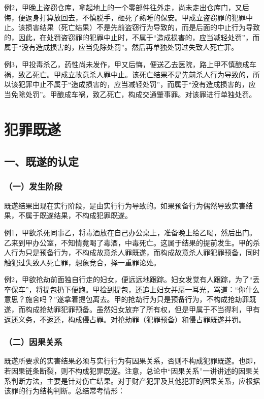 例2，甲晚上盗窃仓库，拿起地上的一个零部件往外走，尚未走出仓库门，又后悔，便返身打算放回去，不慎脱手，砸死了熟睡的保安。甲成立盗窃罪的犯罪中止。该损害结果（死亡结果）不是先前盗窃行为导致的，而是后面的中止行为导致的，因此，在处罚盗窃罪的犯罪中止时，不属于“造成损害的，应当减轻处罚”，而属于“没有造成损害的，应当免除处罚”。然后再单独处罚过失致人死亡罪。

例3，甲投毒杀乙，药性尚未发作，甲又后悔，便送乙去医院，路上甲不慎酿成车祸，致乙死亡。甲成立故意杀人罪中止。该死亡结果不是先前杀人行为导致的，所以该犯罪中止不属于“造成损害的，应当减轻处罚”，而属于“没有造成损害的，应当免除处罚”。甲酿成车祸，致乙死亡，构成交通肇事罪。对该罪进行单独处罚。

\section{犯罪既遂}

\subsection*{一、既遂的认定}

\subsubsection*{（一）发生阶段}

既遂结果出现在实行阶段，是由实行行为导致的。如果预备行为偶然导致实害结果，不属于既遂结果，不构成犯罪既遂。

例1，甲欲杀死同事乙，将毒酒放在自己办公桌上，准备晚上给乙喝，然后出门。乙来到甲办公室，不知情竟喝了毒酒，中毒死亡。这属于结果的提前发生。甲的杀人行为只是预备行为，不构成故意杀人罪既遂，而构成故意杀人罪犯罪预备，同时触犯过失致人死亡罪，想象竞合，择一重罪论处。

例2，甲欲抢劫前面独自行走的妇女，便远远地跟踪。妇女发觉有人跟踪，为了“丢卒保车”，将提包扔下便跑。甲捡到提包，还追上妇女并扇一耳光，骂道：“你什么意思？施舍吗？”遂拿着提包离去。甲的抢劫行为只是预备行为，不构成抢劫罪既遂，而构成抢劫罪犯罪预备。虽然妇女放弃了所有权，但是甲属于不当得利，甲有返还义务，不返还，构成侵占罪。对抢劫罪（犯罪预备）和侵占罪既遂并罚。

\subsubsection*{（二）因果关系}

既遂所要求的实害结果必须与实行行为有因果关系，否则不构成犯罪既遂。也即，若因果链条断裂，则不构成犯罪既遂。注意，总论中“因果关系”一讲讲述的因果关系判断方法，主要是针对伤亡结果。对于财产犯罪及其他犯罪的因果关系，应根据该罪的行为结构判断。总结常考情形：

